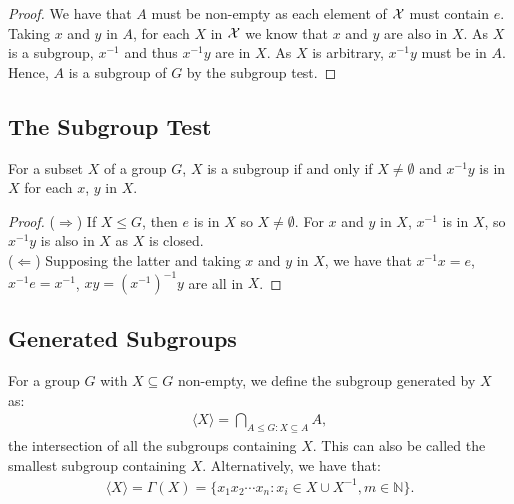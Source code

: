 \begin{proof} We have that $A$ must be non-empty as each element of $\mathcal{X}$
    must contain $e$. Taking $x$ and $y$ in $A$, for each $X$ in $\mathcal{X}$
    we know that $x$ and $y$ are also in $X$. As $X$ is a subgroup, $x^{-1}$ and
    thus $x^{-1}y$ are in $X$. As $X$ is arbitrary, $x^{-1}y$ must be in $A$.
    Hence, $A$ is a subgroup of $G$ by the subgroup test.
\end{proof}

\subsection{The Subgroup Test} \label{1.10}

For a subset $X$ of a group $G$, $X$ is a subgroup if and only if 
$X \neq \emptyset$ and $x^{-1}y$ is in $X$ for each $x$, $y$ in $X$.

\begin{proof}
    ($\Longrightarrow$) If $X \leq G$, then $e$ is in $X$ so 
    $X \neq \emptyset$. For $x$ and $y$ in $X$, $x^{-1}$ is 
    in $X$, so $x^{-1}y$ is also in $X$ as $X$ is closed.
    \\[\baselineskip]
    ($\Longleftarrow$) Supposing the latter and taking $x$ and $y$ 
    in $X$, we have that $x^{-1}x = e$, \linebreak
    $x^{-1}e = x^{-1}$,
    $xy = (x^{-1})^{-1}y$ are all in $X$.
\end{proof}

\newpage

\subsection{Generated Subgroups} \label{1.12}

For a group $G$ with $X \subseteq G$ non-empty, we define the subgroup generated by $X$ as:
\begin{align*}
    \langle X \rangle = \bigcap_{A \leq G : X \subseteq A} A,
\end{align*} the intersection of all the subgroups containing $X$.
This can also be called the smallest subgroup containing $X$.
Alternatively, we have that: \begin{align*}
    \langle X \rangle = \Gamma(X) = \{x_1 x_2 \cdots x_n : x_i \in X \cup X^{-1}, m \in \mathbb{N} \}.
\end{align*}


